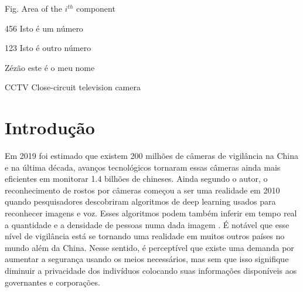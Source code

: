 \documentclass[12pt, %
openright, 
oneside, %
a4paper,    %
brazil]{facom-ufu-abntex2}
\begin{document}
\begin{siglas} %
  \item[Fig.] Area of the $i^{th}$ component
  \item[456] Isto é um número
  \item[123] Isto é outro número
  \item[Zézão] este é o meu nome
  \item[CCTV] Close-circuit television camera 
\end{siglas}


\tableofcontents*
\cleardoublepage





\textual



\chapter[Introdução]{Introdução}
Em 2019 foi estimado que existem 200 milhões de câmeras de vigilância na China e na última década,
avanços tecnológicos tornaram essas câmeras ainda mais eficientes em monitorar 1.4 bilhões de chineses. 
Ainda segundo o autor, o reconhecimento de rostos por câmeras começou a ser uma realidade em 2010 quando pesquisadores 
descobriram algoritmos de deep learning usados para reconhecer imagens e voz. Esses algoritmos podem
também inferir em tempo real a quantidade e a densidade de pessoas numa dada imagem
\cite{qiang2019road}. É notável que esse nível de vigilância está se tornando uma realidade em muitos outros
países no mundo além da China. Nesse sentido, é perceptível que existe uma demanda por aumentar a segurança usando os meios 
necessários, mas sem que isso signifique diminuir a privacidade dos indivíduos colocando suas informações disponíveis aos 
governantes e corporações.
\end{document}
